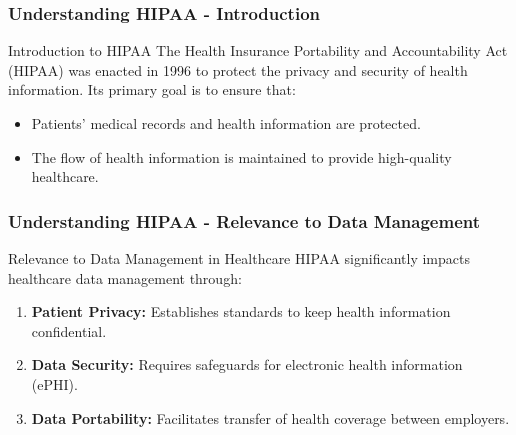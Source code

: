 \documentclass[aspectratio=169]{beamer}
\begin{document}
\begin{frame}[fragile]
    \frametitle{Understanding HIPAA - Introduction}
    \begin{block}{Introduction to HIPAA}
        The Health Insurance Portability and Accountability Act (HIPAA) was enacted in 1996 to protect the privacy and security of health information. 
        Its primary goal is to ensure that:
        \begin{itemize}
            \item Patients' medical records and health information are protected.
            \item The flow of health information is maintained to provide high-quality healthcare.
        \end{itemize}
    \end{block}
\end{frame}

\begin{frame}[fragile]
    \frametitle{Understanding HIPAA - Relevance to Data Management}
    \begin{block}{Relevance to Data Management in Healthcare}
        HIPAA significantly impacts healthcare data management through:
        \begin{enumerate}
            \item \textbf{Patient Privacy:} Establishes standards to keep health information confidential.
            \item \textbf{Data Security:} Requires safeguards for electronic health information (ePHI).
            \item \textbf{Data Portability:} Facilitates transfer of health coverage between employers.
        \end{enumerate}
    \end{block}
\end{frame}
\end{document}
